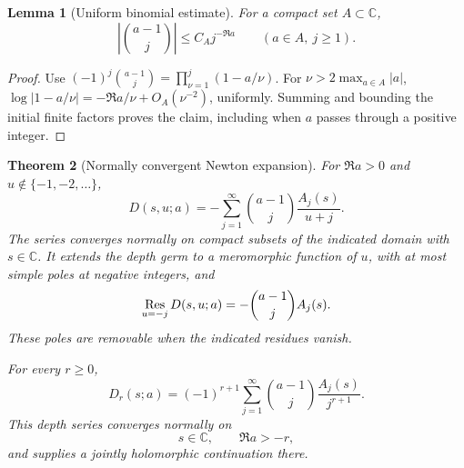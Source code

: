 \documentclass[11pt,a4paper]{article}
\numberwithin{equation}{section}
\newtheorem{theorem}{Theorem}[section]
\newtheorem{lemma}[theorem]{Lemma}
\theoremstyle{definition}
\theoremstyle{remark}
\begin{document}
\begin{lemma}[Uniform binomial estimate]\label{hn:lem:binomial}
For a compact set $A\subset\mathbb C$,
\[
 \left|\binom{a-1}{j}\right|\le C_A j^{-\Re a}
 \qquad(a\in A,\ j\ge1).
\]
\end{lemma}
\begin{proof}
Use $(-1)^j\binom{a-1}{j}=\prod_{\nu=1}^j(1-a/\nu)$.
For $\nu>2\max_{a\in A}|a|$,
$\log|1-a/\nu|=-\Re a/\nu+O_A(\nu^{-2})$, uniformly.
Summing and bounding the initial finite factors proves the claim,
including when $a$ passes through a positive integer.
\end{proof}

\begin{theorem}[Normally convergent Newton expansion]\label{hn:thm:newton}
For $\Re a>0$ and $u\notin\{-1,-2,\ldots\}$,
\begin{equation}\label{hn:eq:newton}
 \boxed{\displaystyle
 D(s,u;a)=-\sum_{j=1}^\infty
                \binom{a-1}{j}\frac{A_j(s)}{u+j}.}
\end{equation}
The series converges normally on compact subsets of the indicated
domain with $s\in\mathbb C$. It extends the depth germ to a
meromorphic function of $u$, with at most simple poles at negative
integers, and
\begin{equation}\label{hn:eq:uresidue}
 \mathop{\rm Res}_{u=-j}D(s,u;a)=-\binom{a-1}{j}A_j(s).
\end{equation}
These poles are removable when the indicated residues vanish.

For every $r\ge0$,
\begin{equation}\label{hn:eq:depthnewton}
 \boxed{\displaystyle
 D_r(s;a)=(-1)^{r+1}\sum_{j=1}^\infty
          \binom{a-1}{j}\frac{A_j(s)}{j^{r+1}}.}
\end{equation}
This depth series converges normally on
\begin{equation}\label{hn:eq:shift-domain}
                  s\in\mathbb C,\qquad \Re a>-r,
\end{equation}
and supplies a jointly holomorphic continuation there.
\end{theorem}
\end{document}
